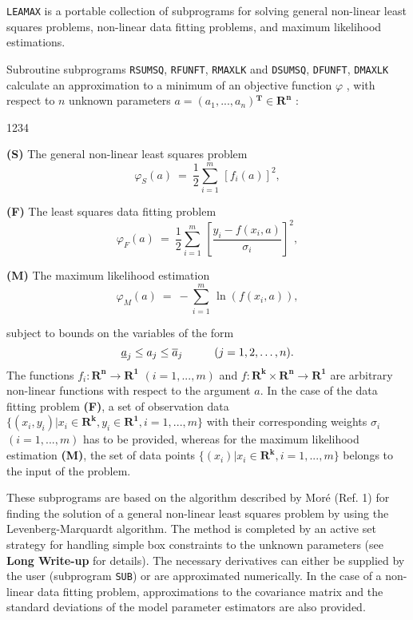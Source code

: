                                 
                   
                           
{\tt LEAMAX} is a portable collection of
subprograms for solving general non-linear least squares problems,
non-linear data fitting problems, and maximum likelihood estimations.

Subroutine subprograms
{\tt RSUMSQ}, {\tt RFUNFT}, {\tt RMAXLK} and
{\tt DSUMSQ}, {\tt DFUNFT}, {\tt DMAXLK}
calculate an approximation to a minimum of an  objective function
$\varphi$ , with respect to $n$ unknown parameters
$a = (a_1,...,a_n) \mathbf{^T} \in \mathbf{R^n}$ : \\ [3mm]
\begin{DL}{1234}
\item[{\bf (S)}] The general non-linear least squares problem
$$ \varphi_S(a) \ = \ \frac{1}{2}
\sum_{i=1}^m\, [f_i(a)]^2,$$
\item[{\bf (F)}] The least squares data fitting problem
$$ \varphi_F(a) \ = \ \frac{1}{2} \sum_{i=1}^m\,
\left[\frac{y_i-f(x_i,a)}{\sigma_i}\right]^2,$$
\item[{\bf (M)}] The maximum likelihood estimation
$$ \varphi_M(a) \ = \ -\sum_{i=1}^m\, \ln (f(x_i,a)),$$
\end{DL}
subject to bounds on the variables of the form
$$ \underline{a}_j \le a_j \le \overline{a}_j
   \mbox{\hspace{1cm}} (j=1,2,\ldots,n).$$
The functions $f_i : \mathbf{R^n} \to \mathbf{R^1}$ $(i=1,...,m)$
and $f : \mathbf{R^k} \times \mathbf{R^n} \to \mathbf{R^1}$ are
arbitrary non-linear functions with respect to the argument $a$.
In the case of the data fitting problem {\bf (F)}, a set of observation
data $\{(x_i,y_i) | x_i \in \mathbf{R^k},
y_i \in \mathbf{R^1},i=1,...,m \}$ with their corresponding
weights $\sigma_i$ $(i=1,...,m)$ has to be provided,
whereas for the maximum likelihood estimation {\bf (M)}, the set of data
points $\{(x_i) | x_i \in \mathbf{R^k},i=1,...,m\}$ belongs to the input
of the problem.

These subprograms are based on the algorithm described by
Mor\'e (Ref. 1) for finding the solution of a general non-linear least
squares problem by using the Levenberg-Marquardt algorithm.
The method is completed
by an active set strategy for handling simple box constraints to the
unknown parameters (see {\bf Long Write-up} for details).
The necessary derivatives can either be supplied by the user
(subprogram {\tt SUB}) or are approximated numerically.
In the case of a non-linear data fitting problem, approximations to
the covariance matrix and the standard deviations of the model
parameter estimators are also provided.

